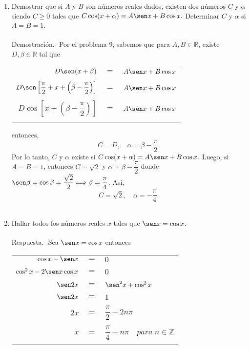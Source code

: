 \begin{enumerate}
\item Demostrar que si $A$ y $B$ son números reales dados, existen dos números $C$  y $\alpha$ siendo $C\geq 0$ tales que $C \cos(x+\alpha) = A \sen x + B\cos x.$ Determinar $C$ y $\alpha$ si $A=B=1$.\\\\
    Demostración.-\; Por el problema 9, sabemos que para $A,B \in \mathbb{R}$, existe $D, \beta \in \mathbb{R}$ tal que 
    \begin{center}
	\begin{tabular}{rcl}
	    $D\sen (x+\beta)$&$=$&$A\sen x + B \cos x$\\\\
	    $D \sen \left[\dfrac{\pi}{2} + x + \left(\beta - \dfrac{\pi}{2}\right)\right]$&$=$&$A \sen x +B \cos x$\\\\
	    $D\cos \left[x + \left(\beta - \dfrac{\pi}{2}\right)\right]$&$=$&$A\sen x + B \cos x$\\\\
	\end{tabular}
    \end{center}
    entonces, $$C=D, \quad \alpha = \beta -\dfrac{\pi}{2}.$$
    Por lo tanto, $C$ y $\alpha$ existe si $C\cos(x+\alpha) = A \sen x + B\cos x.$
    Luego, si $A=B=1$, entonces $C=\sqrt{2}$ y $\alpha = \beta - \dfrac{\pi}{2}$ donde $\sen \beta = \cos \beta = \dfrac{\sqrt{2}}{2} \Longrightarrow \beta = \dfrac{\pi}{4}$. Así,
    $$C = \sqrt{2}, \quad \alpha = - \dfrac{\pi}{4}.$$\\

\item Hallar todos los números reales $x$ tales que $\sen x = \cos x$.\\\\
    Respuesta.-\; Sea $\sen x = \cos x$ entonces 
    \begin{center}
	\begin{tabular}{rcl}
	    $\cos x - \sen x$& $=$ & $0$\\\\
			    $\cos^2 x - 2\sen x\cos x$&$=$&$0$\\\\
			    $\sen 2 x$&$=$&$\sen^2x + \cos^2 x$\\\\
			    $\sen 2x$&$=$&$1$\\\\
			    $2x$&$=$&$\dfrac{\pi}{2}+2n\pi$\\\\
			    $x$&$=$&$\dfrac{\pi}{4} + n\pi \quad para\; n \in \mathbb{Z}$\\\\
	\end{tabular}
    \end{center}


\end{enumerate}
